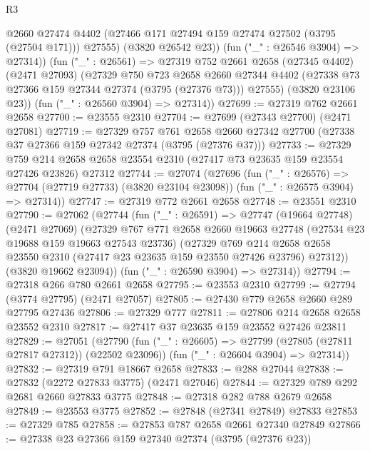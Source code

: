 \begin{lexlean}{R3}
\begin{coremodule}
            @2660
            @27474
            @4402
            (@27466 @171 @27494 @159 @27474 @27502 (@3795 (@27504 @171)))
            @27555)
          (@3820 @26542 @23))
        (fun ("_" : @26546 @3904) => @27314))
      (fun ("_" : @26561) =>
      @27319
        @752
        @2661
        @2658
        (@27345 @4402)
        (@2471 @27093)
        (@27329
          @750
          @723
          @2658
          @2660
          @27344
          @4402
          (@27338 @73 @27366 @159 @27344 @27374 (@3795 (@27376 @73)))
          @27555)
        (@3820 @23106 @23))
      (fun ("_" : @26560 @3904) => @27314))
@27699 := @27319 @762 @2661 @2658
@27700 := @23555 @2310
@27704 := @27699 (@27343 @27700) (@2471 @27081)
@27719 := @27329
    @757
    @761
    @2658
    @2660
    @27342
    @27700
    (@27338 @37 @27366 @159 @27342 @27374 (@3795 (@27376 @37)))
@27733 := @27329
    @759
    @214
    @2658
    @2658
    @23554
    @2310
    (@27417 @73 @23635 @159 @23554 @27426 @23826)
    @27312
@27744 := @27074
    (@27696
      (fun ("_" : @26576) => @27704 (@27719 @27733) (@3820 @23104 @23098))
      (fun ("_" : @26575 @3904) => @27314))
@27747 := @27319 @772 @2661 @2658
@27748 := @23551 @2310
@27790 := @27062
    (@27744
      (fun ("_" : @26591) =>
      @27747
        (@19664 @27748)
        (@2471 @27069)
        (@27329
          @767
          @771
          @2658
          @2660
          @19663
          @27748
          (@27534 @23 @19688 @159 @19663 @27543 @23736)
          (@27329
            @769
            @214
            @2658
            @2658
            @23550
            @2310
            (@27417 @23 @23635 @159 @23550 @27426 @23796)
            @27312))
        (@3820 @19662 @23094))
      (fun ("_" : @26590 @3904) => @27314))
@27794 := @27318 @266 @780 @2661 @2658
@27795 := @23553 @2310
@27799 := @27794 (@3774 @27795) (@2471 @27057)
@27805 := @27430 @779 @2658 @2660 @289 @27795 @27436
@27806 := @27329 @777
@27811 := @27806 @214 @2658 @2658 @23552 @2310
@27817 := @27417 @37 @23635 @159 @23552 @27426 @23811
@27829 := @27051
    (@27790
      (fun ("_" : @26605) => @27799 (@27805 (@27811 @27817 @27312)) (@22502 @23096))
      (fun ("_" : @26604 @3904) => @27314))
@27832 := @27319 @791 @18667 @2658
@27833 := @288 @27044
@27838 := @27832 (@2272 @27833 @3775) (@2471 @27046)
@27844 := @27329 @789 @292 @2681 @2660 @27833 @3775
@27848 := @27318 @282 @788 @2679 @2658
@27849 := @23553 @3775
@27852 := @27848 (@27341 @27849) @27833
@27853 := @27329 @785
@27858 := @27853 @787 @2658 @2661 @27340 @27849
@27866 := @27338 @23 @27366 @159 @27340 @27374 (@3795 (@27376 @23))

\end{coremodule}
\end{lexlean}
